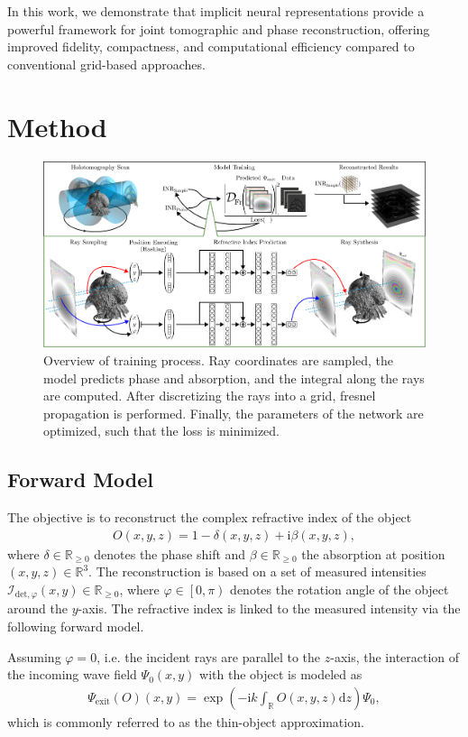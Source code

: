 \documentclass{article}
\begin{document}
In this work, we demonstrate that implicit neural representations provide a powerful framework for joint tomographic and phase reconstruction, offering improved fidelity, compactness, and computational efficiency compared to conventional grid-based approaches.
\section{Method}
\begin{figure}[t!]
	\centering
	\includegraphics[width=0.8\linewidth]{images/overview.png}
	\caption{Overview of training process.
		Ray coordinates are sampled, the model predicts phase and absorption, and the integral along the rays are computed.
		After discretizing the rays into a grid, fresnel propagation is performed.
		Finally, the parameters of the network are optimized, such that the loss is minimized.}
	\label{fig:overiew}
\end{figure}

\subsection{Forward Model}
The objective is to reconstruct the complex refractive index of the object  
\begin{align}
	O \left( x,y,z \right) = 1 - \delta \left( x,y,z \right) + \mathrm{i} \beta \left( x,y,z \right),
	\label{eq:refractive-index}
\end{align}
where $\delta \in \mathbb{R}_{\geq 0}$ denotes the phase shift and $\beta \in \mathbb{R}_{\geq 0}$ the absorption at position $\left( x,y,z \right) \in \mathbb{R}^{3}$.  
The reconstruction is based on a set of measured intensities $\mathcal{I}_{\text{det}, \varphi} \left( x,y \right) \in \mathbb{R}_{\geq 0}$, where $\varphi \in \left[ 0, \pi \right)$ denotes the rotation angle of the object around the $y$-axis.  
The refractive index is linked to the measured intensity via the following forward model.  

Assuming $\varphi = 0$, i.e. the incident rays are parallel to the $z$-axis, the interaction of the incoming wave field $\Psi_{0} \left( x,y \right)$ with the object is modeled as  
\begin{align}
	\Psi_{\text{exit}} \left( O \right) \left( x,y \right) = 
	\exp \left( - \mathrm{i}k \int_{\mathbb{R}} O \left( x,y,z \right) \mathrm{d}z \right) 
	\Psi_{0},
	\label{eq:thin-object}
\end{align}
which is commonly referred to as the thin-object approximation.  
\end{document}
